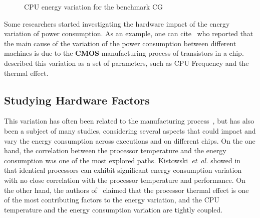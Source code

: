 \begin{figure}%
    \caption{CPU energy variation for the benchmark \textsf{CG}}\label{fig:motivation}
\end{figure}
Some researchers started investigating the hardware impact of the energy variation of power consumption.
As an example, one can cite~\cite{borkar_designing_2005,tschanz_adaptive_2002} who reported that the main cause of the variation of the power consumption between different machines is due to the \textbf{CMOS} manufacturing process of transistors in a chip.
\cite{heinrich_predicting} described this variation as a set of parameters, such as CPU Frequency and the thermal effect.
\subsection{Studying Hardware Factors}
This variation has often been related to the manufacturing process~\cite{coles_comparing_2014}, but has also been a subject of many studies, considering several aspects that could impact and vary the energy consumption across executions and on different chips.
On the one hand, the correlation between the processor temperature and the energy consumption was one of the most explored paths.
Kistowski~\emph{et~al.} showed in~\cite{joakim_v_kisroski_variations_2016} that identical processors can exhibit significant energy consumption variation with no close correlation with the processor temperature and performance.
On the other hand, the authors of~\cite{wang_potential_2018} claimed that the processor thermal effect is one of the most contributing factors to the energy variation, and the CPU temperature and the energy consumption variation are tightly coupled.

